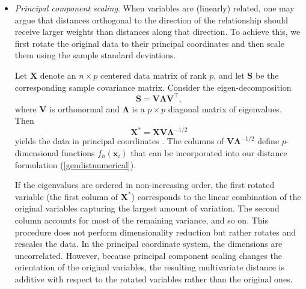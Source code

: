 \documentclass[12pt]{article}
\begin{document}
\begin{itemize}
\item \emph{Principal component scaling}.
When variables are (linearly) related, one may argue that distances orthogonal to the direction of the relationship should receive larger weights than distances along that direction. To achieve this, we first rotate the original data to their principal coordinates and then scale them using the sample standard deviations.

Let $\mathbf{X}$ denote an $n \times p$ centered data matrix of rank $p$, and let $\mathbf{S}$ be the corresponding sample covariance matrix. Consider the eigen-decomposition
\begin{equation*}
    \mathbf{S} = \mathbf{V} \bm{\Lambda}\mathbf{V}^{\top},
\end{equation*}
where $\mathbf{V}$ is orthonormal and $\bm{\Lambda}$ is a $p \times p$ diagonal matrix of eigenvalues. Then
\begin{equation*}
    \mathbf{X}^{*} = \mathbf{X}\mathbf{V}\bm{\Lambda}^{-1/2}
\end{equation*}
yields the data in principal coordinates \parencite{Gower:1966}. The columns of $\mathbf{V}\bm{\Lambda}^{-1/2}$ define $p$-dimensional functions $f_h(\mathbf{x}_i)$ that can be incorporated into our distance formulation (\ref{gendistnumerical}).

If the eigenvalues are ordered in non-increasing order, the first rotated variable (the first column of $\mathbf{X}^{*}$) corresponds to the linear combination of the original variables capturing the largest amount of variation. The second column accounts for most of the remaining variance, and so on. This procedure does not perform dimensionality reduction but rather rotates and rescales the data. In the principal coordinate system, the dimensions are uncorrelated. However, because principal component scaling changes the orientation of the original variables, the resulting multivariate distance is additive with respect to the rotated variables rather than the original ones.
\end{itemize}
\end{document}
